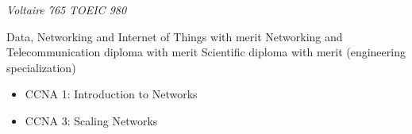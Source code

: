 \documentclass[11pt,a4paper,ragged2e,withhyper]{altacv}
\begin{document}
\begin{paracol}{2}

\switchcolumn
\newpage

\textit{Voltaire 765}
\smallbreak
{}
\textit{TOEIC 980}
\smallbreak
{}
\smallbreak
{}
\smallbreak
{}

Data, Networking and Internet of Things with merit
\smallbreak
\divider
{}
Networking and Telecommunication diploma with merit
\smallbreak
\divider
{}
Scientific diploma with merit (engineering specialization)

\begin{itemize}
  \item CCNA 1: Introduction to Networks
  \item CCNA 3: Scaling Networks
\end{itemize}

\end{paracol}
\end{document}
